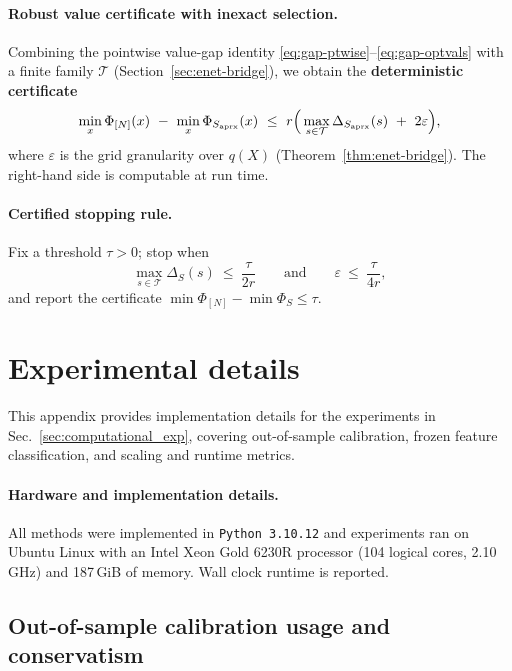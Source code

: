 \documentclass[accepted]{uai2026}
\theoremstyle{plain}
\theoremstyle{definition}
\theoremstyle{remark}
\begin{document}
\paragraph{Robust value certificate with inexact selection.}
Combining the pointwise value-gap identity \eqref{eq:gap-ptwise}--\eqref{eq:gap-optvals} with a finite
family $\mathcal T$ (Section~\ref{sec:enet-bridge}), we obtain the \textbf{deterministic certificate}
\begin{equation}\label{eq:certificado-inexacto}
\min_{x} \Phi_{[N]}(x)\ -\ \min_{x} \Phi_{S_{\rm aprx}}(x)
\ \le\ r\Big(\max_{s\in\mathcal T}\Delta_{S_{\rm aprx}}(s)\ +\ 2\varepsilon\Big),
\end{equation}
where $\varepsilon$ is the grid granularity over $q(X)$ (Theorem~\ref{thm:enet-bridge}).
The right-hand side is computable at run time.

\paragraph{Certified stopping rule.}
Fix a threshold $\tau>0$; stop when
\[
\max_{s\in\mathcal T}\Delta_{S}(s)\ \le\ \frac{\tau}{2r}
\qquad\text{and}\qquad
\varepsilon\ \le\ \frac{\tau}{4r},
\]
and report the certificate \(\min\Phi_{[N]}-\min\Phi_{S}\le \tau\).

\section{Experimental details}
\label{app:exp-details}

This appendix provides implementation details for the experiments in Sec.~\ref{sec:computational_exp}, covering out-of-sample calibration, frozen feature classification, and scaling and runtime metrics.

\paragraph{Hardware and implementation details.}
\label{app:runtime-details}
All methods were implemented in \texttt{Python 3.10.12} and experiments ran on Ubuntu Linux with an Intel\textregistered{} Xeon\textregistered{} Gold 6230R processor (104 logical cores, 2.10\,GHz) and 187\,GiB of memory. Wall clock runtime is reported.

\subsection{Out-of-sample calibration usage and conservatism}
\label{app:oos-usage}
\label{app:calibration_ablation_f1}
\end{document}
